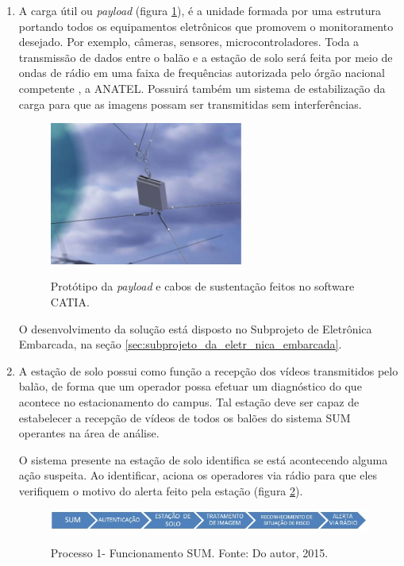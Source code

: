 \begin{enumerate}
\item A carga útil ou \textit{payload} (figura \ref{img:sustentacao}), é a unidade formada por uma estrutura portando todos  os equipamentos eletrônicos que promovem o monitoramento desejado. Por exemplo, câmeras, sensores, microcontroladores. Toda a transmissão de dados entre o balão e a estação de solo será feita por meio de ondas de rádio em uma faixa de frequências autorizada pelo órgão nacional competente , a ANATEL. Possuirá também um sistema de estabilização da carga para que as imagens possam ser transmitidas sem interferências.

\begin{figure}[htp]
\centering
\caption{Protótipo da \textit{payload} e cabos de sustentação feitos no software CATIA.}
\includegraphics[width=0.6\textwidth]{figuras/PAYLOADRENDERIZADA}
\label{img:sustentacao}
\end{figure}

O desenvolvimento da solução está disposto no Subprojeto de Eletrônica Embarcada, na seção \ref{sec:subprojeto_da_eletr_nica_embarcada}.

\item A estação de solo possui como função a recepção dos vídeos transmitidos pelo balão, de forma que um operador possa efetuar um diagnóstico do que acontece no estacionamento do campus. Tal estação deve ser capaz de estabelecer a recepção de vídeos de todos os balões do sistema SUM operantes na área de análise.

O sistema presente na estação de solo identifica se  está acontecendo alguma ação suspeita. Ao identificar,  aciona os operadores via rádio  para que eles verifiquem o motivo do alerta feito pela estação (figura \ref{img:processo}).

	\begin{figure}[H]
		\centering
		\caption{Processo 1- Funcionamento SUM. Fonte: Do autor, 2015.}
		\includegraphics[width=\textwidth]{figuras/processo}
		\label{img:processo}
	\end{figure}



\end{enumerate}
